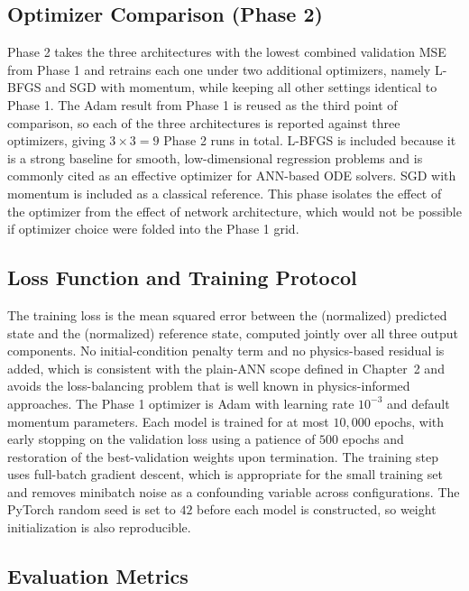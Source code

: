 \subsection{Optimizer Comparison (Phase 2)}

Phase 2 takes the three architectures with the lowest combined validation MSE from Phase 1 and retrains each one under two additional optimizers, namely L-BFGS and SGD with momentum, while keeping all other settings identical to Phase 1. The Adam result from Phase 1 is reused as the third point of comparison, so each of the three architectures is reported against three optimizers, giving $3 \times 3 = 9$ Phase 2 runs in total. L-BFGS is included because it is a strong baseline for smooth, low-dimensional regression problems and is commonly cited as an effective optimizer for ANN-based ODE solvers. SGD with momentum is included as a classical reference. This phase isolates the effect of the optimizer from the effect of network architecture, which would not be possible if optimizer choice were folded into the Phase 1 grid.

\subsection{Loss Function and Training Protocol}

The training loss is the mean squared error between the (normalized) predicted state and the (normalized) reference state, computed jointly over all three output components. No initial-condition penalty term and no physics-based residual is added, which is consistent with the plain-ANN scope defined in Chapter~2 and avoids the loss-balancing problem that is well known in physics-informed approaches. The Phase 1 optimizer is Adam with learning rate $10^{-3}$ and default momentum parameters. Each model is trained for at most $10{,}000$ epochs, with early stopping on the validation loss using a patience of $500$ epochs and restoration of the best-validation weights upon termination. The training step uses full-batch gradient descent, which is appropriate for the small training set and removes minibatch noise as a confounding variable across configurations. The PyTorch random seed is set to $42$ before each model is constructed, so weight initialization is also reproducible.

\subsection{Evaluation Metrics}

